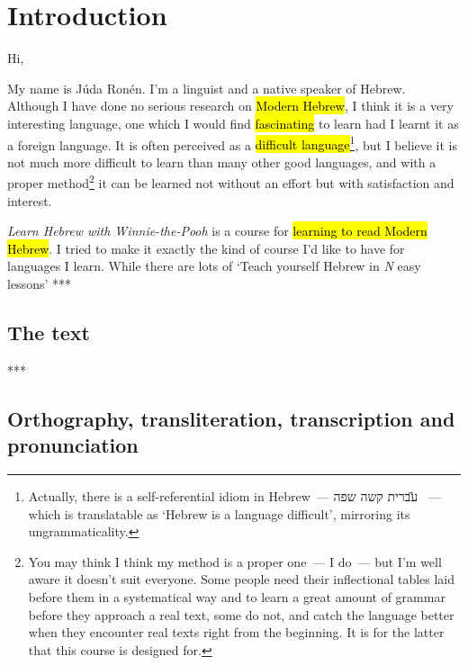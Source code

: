 



\section*{Introduction}

Hi,

My name is Júda Ronén. I'm a linguist and a native speaker of Hebrew. Although I have done no serious research on \hl{Modern Hebrew}, I think it is a very interesting language, one which I would find \hl{fascinating} to learn had I learnt it as a foreign language. It is often perceived as a \hl{difficult language}\footnote{Actually, there is a self-referential idiom in Hebrew~— \H{עברית קשה שפה} ~— which is translatable as ‘Hebrew is a language difficult’, mirroring its ungrammaticality.}, but I believe it is not much more difficult to learn than many other good languages, and with a proper method\footnote{You may think I think my method is a proper one~— I do~— but I'm well aware it doesn't suit everyone. Some people need their inflectional tables laid before them in a systematical way and to learn a great amount of grammar before they approach a real text, some do not, and catch the language better when they encounter real texts right from the beginning. It is for the latter that this course is designed for.} it can be learned not without an effort but with satisfaction and interest.

\emph{Learn Hebrew with Winnie-the-Pooh} is a course for \hl{learning to read Modern Hebrew}. I tried to make it exactly the kind of course I'd like to have for languages I learn. While there are lots of ‘Teach yourself Hebrew in \emph{N} easy lessons’ ***



\subsection*{The text}

***



\subsection*{Orthography, transliteration, transcription and pronunciation}



